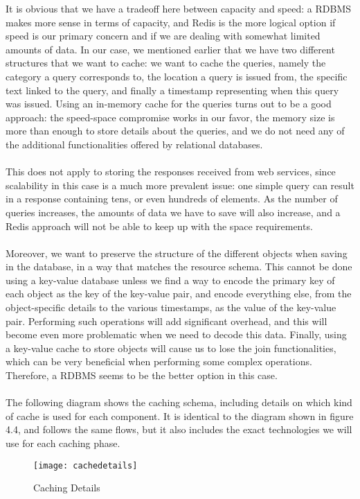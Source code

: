 It is obvious that we have a tradeoff here between capacity and speed: a RDBMS makes more sense in terms of capacity, and Redis is the more logical option if speed is our primary concern and if we are dealing with somewhat limited amounts of data. In our case, we mentioned earlier that we have two different structures that we want to cache: we want to cache the queries, namely the category a query corresponds to, the location a query is issued from, the specific text linked to the query, and finally a timestamp representing when this query was issued. Using an in-memory cache for the queries turns out to be a good approach: the speed-space compromise works in our favor, the memory size is more than enough to store details about the queries, and we do not need any of the additional functionalities offered by relational databases.\\\\
This does not apply to storing the responses received from web services, since scalability in this case is a much more prevalent issue: one simple query can result in a response containing tens, or even hundreds of elements. As the number of queries increases, the amounts of data we have to save will also increase, and a Redis approach will not be able to keep up with the space requirements.\\\\
Moreover, we want to preserve the structure of the different objects when saving in the database, in a way that matches the resource schema. This cannot be done using a key-value database unless we find a way to encode the primary key of each object as the key of the key-value pair, and encode everything else, from the object-specific details to the various timestamps, as the value of the key-value pair. Performing such operations will add significant overhead, and this will become even more problematic when we need to decode this data. Finally, using a key-value cache to store objects will cause us to lose the join functionalities, which can be very beneficial when performing some complex operations. Therefore, a RDBMS seems to be the better option in this case.\\\\
The following diagram shows the caching schema, including details on which kind of cache is used for each component. It is identical to the diagram shown in figure 4.4, and follows the same flows, but it also includes the exact technologies we will use for each caching phase.
\begin{figure}[h]
\centering
\texttt{[image: cachedetails]}
\caption{Caching Details}
\end{figure}
\newpage
